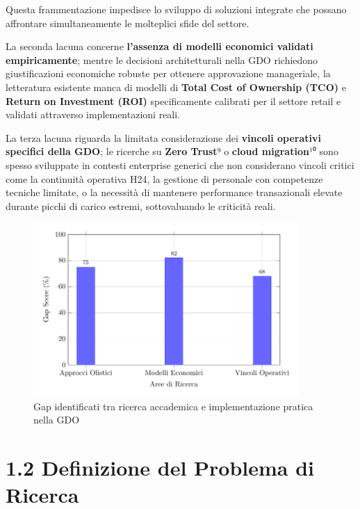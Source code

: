 \documentclass{report}
\begin{document}
Questa frammentazione impedisce lo sviluppo di soluzioni integrate che
possano affrontare simultaneamente le molteplici sfide del settore.

La seconda lacuna concerne \textbf{l'assenza di modelli economici validati
empiricamente}; mentre le decisioni architetturali nella GDO richiedono
giustificazioni economiche robuste per ottenere approvazione
manageriale, la letteratura esistente manca di modelli di \textbf{Total
Cost of Ownership (TCO)} e \textbf{Return on Investment (ROI)}
specificamente calibrati per il settore retail e validati attraverso
implementazioni reali.

La terza lacuna riguarda la limitata considerazione dei \textbf{vincoli
operativi specifici della GDO}; le ricerche su \textbf{Zero Trust}⁹ o
\textbf{cloud migration}¹⁰ sono spesso sviluppate in contesti enterprise
generici che non considerano vincoli critici come la continuità
operativa H24, la gestione di personale con competenze tecniche
limitate, o la necessità di mantenere performance transazionali elevate
durante picchi di carico estremi, sottovaluando le criticità reali.

\begin{figure}[htbp]
    \centering
    \includegraphics[width=0.9\textwidth]{figura 1-1}
    \caption{Gap identificati tra ricerca accademica e implementazione pratica nella GDO}
\label{fig:gap_ricerca}
\end{figure}

\section{\texorpdfstring{\textbf{1.2 Definizione del Problema di
Ricerca}}{1.2 Definizione del Problema di Ricerca}}\label{definizione-del-problema-di-ricerca}
\end{document}
